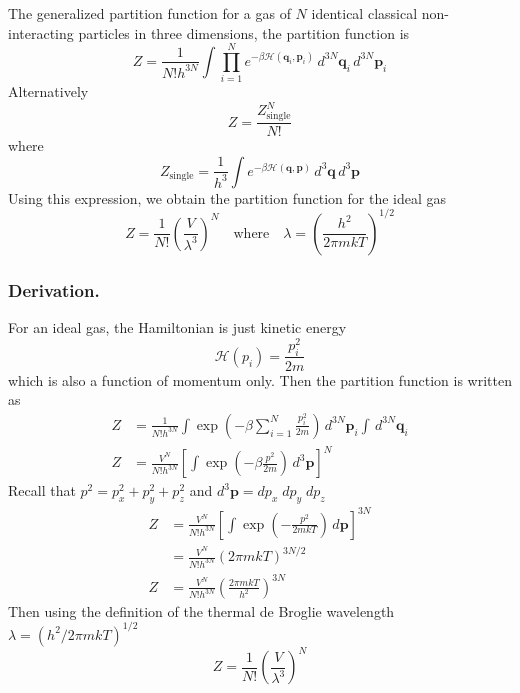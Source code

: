 \documentclass[../../../Main.tex]{subfiles}
\begin{document}
The generalized partition function for a gas of $N$ identical classical non-interacting particles in three dimensions, the partition function is
\begin{equation*}
    Z=\frac{1}{N!h^{3N}} \int \prod_{i=1}^{N} e^{-\beta \mathcal{H}(\mathbf{q}_i, \mathbf{p}_i)} \, d^{3N} \mathbf{q}_i \, d^{3N} \mathbf{p}_i
\end{equation*}
Alternatively
\begin{equation*}
    Z= \frac{Z^N_\text{single}}{N!}
\end{equation*}
where
\begin{equation*}
    Z_\text{single}= \frac{1}{h^{3}} \int e^{-\beta \mathcal{H}(\mathbf{q}, \mathbf{p})} \, d^{3} \mathbf{q} \, d^{3} \mathbf{p}
\end{equation*}
Using this expression, we obtain the partition function for the ideal gas 
\begin{equation*}
    Z=\frac{1}{N!}\left(\frac{V}{\lambda^3}\right)^N\quad\text{where}\quad \lambda=\left(\frac{h^2}{2\pi mkT}\right)^{1/2}
\end{equation*}

\subsubsection*{Derivation.} For an ideal gas, the Hamiltonian is just kinetic energy
\begin{equation*}
    \mathcal{H}(p_i)=\frac{p_i^2}{2m}
\end{equation*}
which is also a function of momentum only. Then the partition function is written as 
\begin{align*}
    Z&=\frac{1}{N!h^{3N}} \int \exp\left(-\beta\sum_{i=1}^{N}\frac{p_i^2}{2m}\right) \, d^{3N} \mathbf{p}_i \int\, d^{3N} \mathbf{q}_i\\
    Z&=\frac{V^N}{N!h^{3N}}\left[ \int \exp\left(-\beta\frac{p^2}{2m}\right) \, d^{3} \mathbf{p} \right]^N
\end{align*}
Recall that $p^2=p_x^2 +p_y^2 +p_z^2$ and $d^{3} \mathbf{p}=dp_x\;dp_y\;dp_z$
\begin{align*}
    Z&=\frac{V^N}{N!h^{3N}}\left[ \int \exp\left(-\frac{p^2}{2mkT}\right) \, d\mathbf{p} \right]^{3N}\\
    &=\frac{V^N}{N!h^{3N}}(2\pi mkT )^{3N/2}\\
    Z&=\frac{V^N}{N!h^{3N}}\left(\frac{2\pi mkT}{h^2}\right)^{3N}
\end{align*}
Then using the definition of the thermal de Broglie wavelength $\lambda= (h^2/2\pi mkT)^{1/2}$
\begin{equation*}
    Z=\frac{1}{N!}\left(\frac{V}{\lambda^3}\right)^N
\end{equation*}
\end{document}
